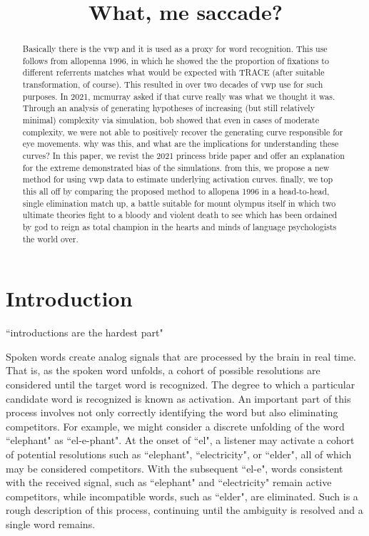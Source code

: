 \documentclass{article}
\title{What, me saccade?}
\date{}
\begin{document}

\maketitle

%

\begin{abstract}
Basically there is the vwp and it is used as a proxy for word recognition. This use follows from allopenna 1996, in which he showed the the proportion of fixations to different referrents matches what would be expected with TRACE (after suitable transformation, of course). This resulted in over two decades of vwp use for such purposes. In 2021, mcmurray asked if that curve really was what we thought it was. Through an analysis of generating hypotheses of increasing (but still relatively minimal) complexity via simulation, bob showed that even in cases of moderate complexity, we were not able to positively recover the generating curve responsible for eye movements. why was this, and what are the implications for understanding these curves? In this paper, we revist the 2021 princess bride paper and offer an explanation for the extreme demonstrated bias of the simulations. from this, we propose a new method for using vwp data to estimate underlying activation curves. finally, we top this all off by comparing the proposed method to allopena 1996 in a head-to-head, single elimination match up, a battle suitable for mount olympus itself in which two ultimate theories fight to a bloody and violent death to see which has been ordained by god to reign as total champion in the hearts and minds of language psychologists the world over.
\end{abstract}

\section{Introduction}
``introductions are the hardest part"

Spoken words create analog signals that are processed by the brain in real time. That is, as the spoken word unfolds, a cohort of possible resolutions are considered until the target word is recognized. The degree to which a particular candidate word is recognized is known as activation. An important part of this process involves not only correctly identifying the word but also eliminating competitors. For example, we might consider a discrete unfolding of the word ``elephant" as ``el-e-phant". At the onset of ``el", a listener may activate a cohort of potential resolutions such as ``elephant", ``electricity", or ``elder", all of which may be considered competitors. With the subsequent ``el-e", words consistent with the received signal, such as ``elephant" and ``electricity" remain active competitors, while incompatible words, such as ``elder", are eliminated. Such is a rough description of this process, continuing until the ambiguity is resolved and a single word remains.
\end{document}
